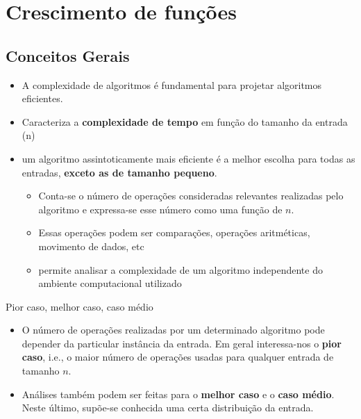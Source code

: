 \documentclass{beamer}
\begin{document}
\section{Crescimento de funções}
\subsection{Conceitos Gerais}
\begin{frame}
    \begin{itemize}
     \item A complexidade de algoritmos é
fundamental para projetar algoritmos eficientes.
     \item Caracteriza a \textbf{complexidade de tempo} em função do tamanho da entrada (n)
     \item um algoritmo assintoticamente mais eficiente é a melhor escolha para todas as entradas, \textbf{exceto as de tamanho pequeno}.
     \begin{itemize}
      \item Conta-se o número de operações
consideradas relevantes realizadas pelo algoritmo e
expressa-se esse número como uma função de $n$.
\item Essas operações podem ser comparações, operações
aritméticas, movimento de dados, etc
\item permite analisar a complexidade de um algoritmo independente do
ambiente computacional utilizado
     \end{itemize}


    \end{itemize}

 \end{frame}

 \begin{frame}{Pior caso, melhor caso, caso médio}
\begin{itemize}
 \item O número de operações realizadas por um determinado
algoritmo pode depender da particular instância da
entrada. Em geral interessa-nos o \textbf{pior caso}, i.e., o maior
número de operações usadas para qualquer entrada de
tamanho $n$.
\item Análises também podem ser feitas para o \textbf{melhor caso} e o
\textbf{caso médio}. Neste último, supõe-se conhecida uma certa
distribuição da entrada.
\end{itemize}

 \end{frame}

 
\end{document}
